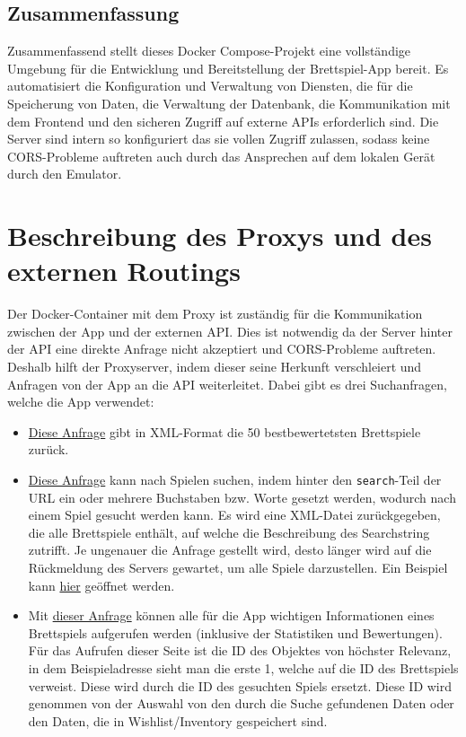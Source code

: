 \subsection{Zusammenfassung}
Zusammenfassend stellt dieses Docker Compose-Projekt eine vollständige Umgebung für die
Entwicklung und Bereitstellung der Brettspiel-App bereit. Es automatisiert die Konfiguration
und Verwaltung von Diensten, die für die Speicherung von Daten, die Verwaltung der
Datenbank, die Kommunikation mit dem Frontend und den sicheren Zugriff auf externe APIs
erforderlich sind. Die Server sind intern so konfiguriert das sie vollen Zugriff zulassen, sodass
keine CORS-Probleme auftreten auch durch das Ansprechen auf dem lokalen Gerät durch den
Emulator.
\section{Beschreibung des Proxys und des externen Routings}
Der Docker-Container mit dem Proxy ist zuständig für die Kommunikation zwischen der App
und der externen \ac{API}. Dies ist notwendig da der Server hinter der \ac{API} eine direkte Anfrage
nicht akzeptiert und CORS-Probleme auftreten. Deshalb hilft der Proxyserver, indem dieser
seine Herkunft verschleiert und Anfragen von der App an die \ac{API} weiterleitet. Dabei gibt es
drei Suchanfragen, welche die App verwendet:
\begin{itemize}
    \item \href{https://api.geekdo.com/xmlapi2/hotoverall}{Diese Anfrage} gibt in XML-Format die 50 bestbewertetsten Brettspiele zurück.
    \item \href{https://api.geekdo.com/xmlapi/search?search=}{Diese Anfrage} kann nach Spielen suchen, indem hinter den \texttt{search}-Teil der URL ein oder mehrere Buchstaben bzw. Worte gesetzt werden, wodurch nach einem Spiel gesucht werden kann. Es wird eine XML-Datei zurückgegeben, die alle Brettspiele enthält, auf welche die Beschreibung des Searchstring zutrifft. Je ungenauer die Anfrage gestellt wird, desto länger wird auf die Rückmeldung des Servers gewartet, um alle Spiele darzustellen. Ein Beispiel kann \href{https://api.geekdo.com/xmlapi/search?search=to}{hier} geöffnet werden.
    \item Mit \href{https://api.geekdo.com/xmlapi/boardgame/1&stats=1} {dieser Anfrage} können alle für die App wichtigen Informationen eines Brettspiels aufgerufen werden (inklusive der Statistiken und Bewertungen). Für das Aufrufen dieser Seite ist die ID des Objektes von höchster Relevanz, in dem Beispieladresse sieht man die erste 1, welche auf die ID des Brettspiels verweist. Diese wird durch die ID des gesuchten Spiels ersetzt. Diese ID wird genommen von der Auswahl von den durch die Suche gefundenen Daten oder den Daten, die in Wishlist/Inventory gespeichert sind.
\end{itemize}
